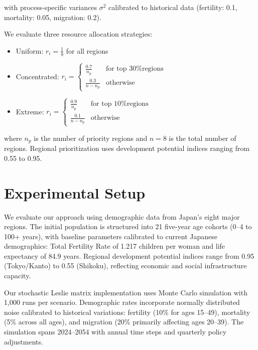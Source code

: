 \documentclass{article} %
\begin{document}
with process-specific variances $\sigma^2$ calibrated to historical data (fertility: 0.1, mortality: 0.05, migration: 0.2).

We evaluate three resource allocation strategies:
\begin{itemize}
    \item Uniform: $r_i = \frac{1}{8}$ for all regions
    \item Concentrated: $r_i = \begin{cases} 
        \frac{0.7}{n_p} & \text{for top 30\% regions} \\
        \frac{0.3}{n-n_p} & \text{otherwise}
        \end{cases}$
    \item Extreme: $r_i = \begin{cases}
        \frac{0.9}{n_p} & \text{for top 10\% regions} \\
        \frac{0.1}{n-n_p} & \text{otherwise}
        \end{cases}$
\end{itemize}

where $n_p$ is the number of priority regions and $n=8$ is the total number of regions. Regional prioritization uses development potential indices ranging from 0.55 to 0.95.

\section{Experimental Setup}
\label{sec:experimental}

We evaluate our approach using demographic data from Japan's eight major regions. The initial population is structured into 21 five-year age cohorts (0--4 to 100+ years), with baseline parameters calibrated to current Japanese demographics: Total Fertility Rate of 1.217 children per woman and life expectancy of 84.9 years. Regional development potential indices range from 0.95 (Tokyo/Kanto) to 0.55 (Shikoku), reflecting economic and social infrastructure capacity.

Our stochastic Leslie matrix implementation uses Monte Carlo simulation with 1,000 runs per scenario. Demographic rates incorporate normally distributed noise calibrated to historical variations: fertility (10\% for ages 15--49), mortality (5\% across all ages), and migration (20\% primarily affecting ages 20--39). The simulation spans 2024--2054 with annual time steps and quarterly policy adjustments.
\end{document}
